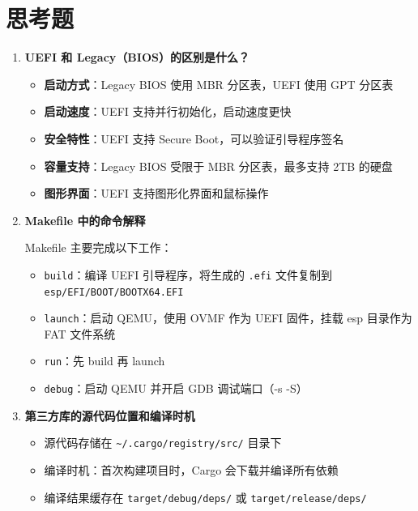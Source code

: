 \documentclass{SYSUReport}
\begin{document}
\section{思考题}

\begin{enumerate}[label=\arabic*.]
    \item \textbf{UEFI 和 Legacy（BIOS）的区别是什么？}
    
    \begin{itemize}
        \item \textbf{启动方式}：Legacy BIOS 使用 MBR 分区表，UEFI 使用 GPT 分区表
        \item \textbf{启动速度}：UEFI 支持并行初始化，启动速度更快
        \item \textbf{安全特性}：UEFI 支持 Secure Boot，可以验证引导程序签名
        \item \textbf{容量支持}：Legacy BIOS 受限于 MBR 分区表，最多支持 2TB 的硬盘
        \item \textbf{图形界面}：UEFI 支持图形化界面和鼠标操作
    \end{itemize}
    
    \item \textbf{Makefile 中的命令解释}
    
    Makefile 主要完成以下工作：
    \begin{itemize}
        \item \texttt{build}：编译 UEFI 引导程序，将生成的 \texttt{.efi} 文件复制到 \texttt{esp/EFI/BOOT/BOOTX64.EFI}
        \item \texttt{launch}：启动 QEMU，使用 OVMF 作为 UEFI 固件，挂载 esp 目录作为 FAT 文件系统
        \item \texttt{run}：先 build 再 launch
        \item \texttt{debug}：启动 QEMU 并开启 GDB 调试端口（-s -S）
    \end{itemize}
    
    \item \textbf{第三方库的源代码位置和编译时机}
    
    \begin{itemize}
        \item 源代码存储在 \texttt{\textasciitilde/.cargo/registry/src/} 目录下
        \item 编译时机：首次构建项目时，Cargo 会下载并编译所有依赖
        \item 编译结果缓存在 \texttt{target/debug/deps/} 或 \texttt{target/release/deps/}
    \end{itemize}
    

\end{enumerate}
\end{document}
